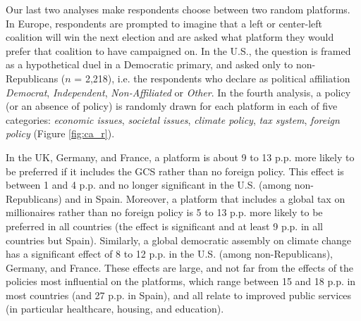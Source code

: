 \begin{stretchpars}
Our last two analyses  make respondents choose between two random platforms. In Europe, respondents are prompted to imagine that a left or center-left coalition will win the next election and are asked what platform they would prefer that coalition to have campaigned on. In the U.S., the question is framed as a hypothetical duel in a Democratic primary, and asked only to non-Republicans ($n$ = 2,218), i.e. the respondents who declare as political affiliation \textit{Democrat}, \textit{Independent}, \textit{Non-Affiliated} or \textit{Other}. In the fourth analysis, a policy (or an absence of policy) is randomly drawn for each platform in each of five categories: \textit{economic issues}, \textit{societal issues}, \textit{climate policy}, \textit{tax system}, \textit{foreign policy} (Figure \ref{fig:ca_r}). 

In the UK, Germany, and France, a platform is about 9 to 13 p.p. more likely to be preferred if it includes the GCS rather than no foreign policy. %
This effect is between 1 and 4 p.p. and no longer significant in the U.S. (among non-Republicans) and in Spain. Moreover, a platform that includes a global tax on millionaires rather than no foreign policy is 5 to 13 p.p. more likely to be preferred in all countries (the effect is significant and at least 9 p.p. in all countries but Spain). 
Similarly, a global democratic assembly on climate change has a significant effect of 8 to 12 p.p. in the U.S. (among non-Republicans), Germany, and France. 
These effects are large, and not far from the effects of the policies most influential on the platforms, which range between 15 and 18 p.p. in most countries (and 27 p.p. in Spain), and all relate to improved public services (in particular healthcare, housing, and education).
\end{stretchpars}
 
